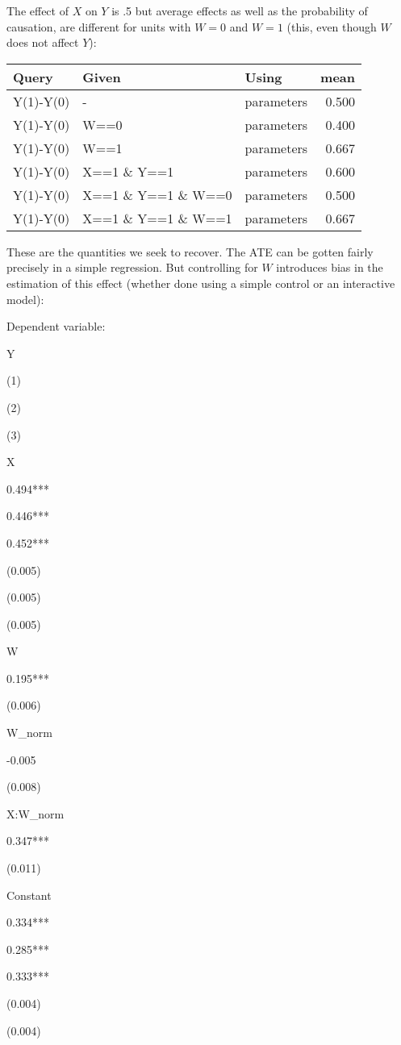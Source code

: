 \documentclass[
  12pt,
]{book}
\begin{document}
The effect of \(X\) on \(Y\) is .5 but average effects as well as the probability of causation, are different for units with \(W=0\) and \(W=1\) (this, even though \(W\) does not affect \(Y\)):

\begin{tabular}{l|l|l|r}
\hline
Query & Given & Using & mean\\
\hline
Y(1)-Y(0) & - & parameters & 0.500\\
\hline
Y(1)-Y(0) & W==0 & parameters & 0.400\\
\hline
Y(1)-Y(0) & W==1 & parameters & 0.667\\
\hline
Y(1)-Y(0) & X==1 \& Y==1 & parameters & 0.600\\
\hline
Y(1)-Y(0) & X==1 \& Y==1 \& W==0 & parameters & 0.500\\
\hline
Y(1)-Y(0) & X==1 \& Y==1 \& W==1 & parameters & 0.667\\
\hline
\end{tabular}

These are the quantities we seek to recover. The ATE can be gotten fairly precisely in a simple regression. But controlling for \(W\) introduces bias in the estimation of this effect (whether done using a simple control or an interactive model):

Dependent variable:

Y

(1)

(2)

(3)

X

0.494***

0.446***

0.452***

(0.005)

(0.005)

(0.005)

W

0.195***

(0.006)

W\_norm

-0.005

(0.008)

X:W\_norm

0.347***

(0.011)

Constant

0.334***

0.285***

0.333***

(0.004)

(0.004)
\end{document}
